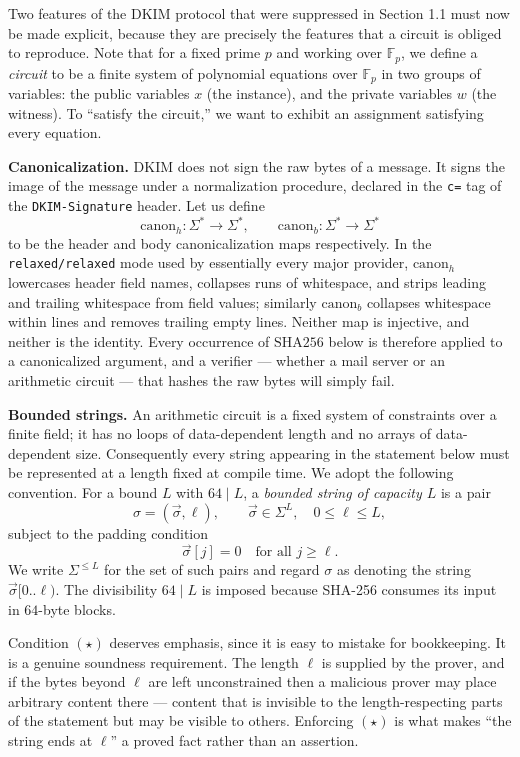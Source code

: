 \documentclass[12pt,reqno]{amsart}
\theoremstyle{definition}
\newcommand{\bbF}{\mathbb{F}}
\newcommand{\sha}{\mathrm{SHA256}}
\newcommand{\canon}{\mathrm{canon}}
\begin{document}
Two features of the DKIM protocol that were suppressed in Section 1.1 must now be made explicit, because they are precisely the features that a circuit is obliged to reproduce. Note that for a fixed prime $p$ and working over $\bbF_p$, we define a \textit{circuit} to be a finite system of polynomial equations over $\bbF_p$ in two groups of variables: the public variables $x$ (the instance), and the private variables $w$ (the witness). To ``satisfy the circuit,'' we want to exhibit an assignment satisfying every equation.
 
\medskip
\noindent\textbf{Canonicalization.} DKIM does not sign the raw bytes of a message. It signs the image of the message under a normalization procedure, declared in the \texttt{c=} tag of the \texttt{DKIM-Signature} header. Let us define
\[
  \canon_{h} : \Sigma^{*} \to \Sigma^{*}, \qquad
  \canon_{b} : \Sigma^{*} \to \Sigma^{*}
\]
to be the header and body canonicalization maps respectively. In the \texttt{relaxed/relaxed} mode used by essentially every major provider, $\canon_{h}$ lowercases header field names, collapses runs of whitespace, and
strips leading and trailing whitespace from field values; similarly $\canon_{b}$ collapses whitespace within lines and removes trailing empty lines. Neither map is injective, and neither is the identity. Every occurrence of $\sha$ below is therefore applied to a canonicalized argument, and a verifier --- whether a mail
server or an arithmetic circuit --- that hashes the raw bytes will simply fail.
 
\medskip
\noindent\textbf{Bounded strings.} An arithmetic circuit is a fixed system of
constraints over a finite field; it has no loops of data-dependent length and no
arrays of data-dependent size. Consequently every string appearing in the
statement below must be represented at a length fixed at compile time. We adopt
the following convention. For a bound $L$ with $64 \mid L$, a
\emph{bounded string of capacity $L$} is a pair
\[
  \sigma = (\vec{\sigma}, \ell), \qquad \vec{\sigma} \in \Sigma^{L}, \quad
  0 \le \ell \le L,
\]
subject to the padding condition
\[
  \vec{\sigma}[j] = 0 \quad \text{for all } j \ge \ell. \tag{$\star$}
\]
We write $\Sigma^{\le L}$ for the set of such pairs and regard $\sigma$ as
denoting the string $\vec{\sigma}[0..\ell)$. The divisibility $64 \mid L$ is
imposed because SHA-256 consumes its input in $64$-byte blocks.
 
Condition $(\star)$ deserves emphasis, since it is easy to mistake for
bookkeeping. It is a genuine soundness requirement. The length $\ell$ is supplied
by the prover, and if the bytes beyond $\ell$ are left unconstrained then a
malicious prover may place arbitrary content there --- content that is
invisible to the length-respecting parts of the statement but may be visible to
others. Enforcing $(\star)$ is what makes ``the string ends at $\ell$''
a proved fact rather than an assertion.
 
\end{document}
